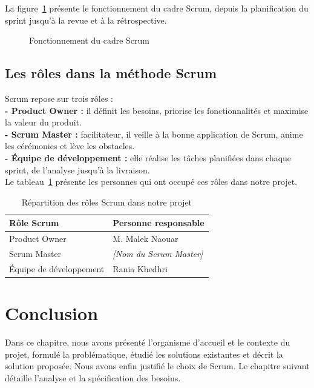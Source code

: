 \Needspace{12cm}
La figure~\ref{fig:fonctionnement-scrum} présente le fonctionnement du cadre Scrum, depuis la planification du sprint jusqu'à la revue et à la rétrospective.
\begin{figure}[H]
    \centering
    \caption{Fonctionnement du cadre Scrum~\cite{ScrumGuide2020}}
    \label{fig:fonctionnement-scrum}
\end{figure}

\subsection{Les rôles dans la méthode Scrum}
Scrum repose sur trois rôles :\\

\noindent \textbf{- Product Owner :} il définit les besoins, priorise les fonctionnalités et maximise la valeur du produit.\\
\noindent \textbf{- Scrum Master :} facilitateur, il veille à la bonne application de Scrum, anime les cérémonies et lève les obstacles.\\
\noindent \textbf{- Équipe de développement :} elle réalise les tâches planifiées dans chaque sprint, de l'analyse jusqu'à la livraison.\\

Le tableau~\ref{tab:roles_scrum} présente les personnes qui ont occupé ces rôles dans notre projet.
\begin{table}[H]
\centering
\renewcommand{\arraystretch}{1.4}
\begin{tabular}{|p{5cm}|p{8cm}|}
\hline
\textbf{Rôle Scrum} & \textbf{Personne responsable} \\
\hline
Product Owner & M. Malek Naouar \\
\hline
Scrum Master & \textit{[Nom du Scrum Master]} \\
\hline
Équipe de développement & Rania Khedhri \\
\hline
\end{tabular}
\caption{Répartition des rôles Scrum dans notre projet}
\label{tab:roles_scrum}
\end{table}

\section*{Conclusion}
Dans ce chapitre, nous avons présenté l'organisme d'accueil et le contexte du projet, formulé la problématique, étudié les solutions existantes et décrit la solution proposée. Nous avons enfin justifié le choix de Scrum. Le chapitre suivant détaille l'analyse et la spécification des besoins.

